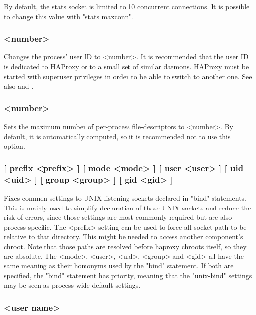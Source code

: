 By default, the stats socket is limited to 10 concurrent connections. It is
possible to change this value with "stats maxconn".

\subsubsection[uid]{ <number>}

Changes the process' user ID to <number>. It is recommended that the user ID
is dedicated to HAProxy or to a small set of similar daemons. HAProxy must
be started with superuser privileges in order to be able to switch to another
one. See also  and .

\subsubsection[ulimit-n]{ <number>}

Sets the maximum number of per-process file-descriptors to <number>. By
default, it is automatically computed, so it is recommended not to use this
option.

\subsubsection[unix-bind]{ [ prefix <prefix> ] [ mode <mode> ] 
[ user <user> ] [ uid <uid> ] [ group <group> ] [ gid <gid> ]}

Fixes common settings to UNIX listening sockets declared in "bind" statements.
This is mainly used to simplify declaration of those UNIX sockets and reduce
the risk of errors, since those settings are most commonly required but are
also process-specific. The <prefix> setting can be used to force all socket
path to be relative to that directory. This might be needed to access another
component's chroot. Note that those paths are resolved before haproxy chroots
itself, so they are absolute. The <mode>, <user>, <uid>, <group> and <gid>
all have the same meaning as their homonyms used by the "bind" statement. If
both are specified, the "bind" statement has priority, meaning that the
"unix-bind" settings may be seen as process-wide default settings.

\subsubsection[user]{ <user name>}


